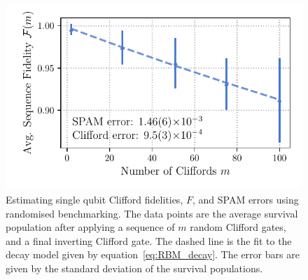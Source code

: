     \begin{figure}
        \begin{center}
        \noindent\includegraphics[width=0.75\linewidth]{
            figures/pdf_figure/rbm_fit.pdf
            }
        \end{center}
        \caption{
            Estimating single qubit Clifford fidelities, $F$, and SPAM errors using randomised benchmarking. 
            The data points are the average survival population after applying a sequence of $m$ random Clifford gates, and a final inverting Clifford gate. The dashed line is the fit to the decay model given by equation~\ref{eq:RBM_decay}. The error bars are given by the standard deviation of the survival populations.
            }
        \label{fig:rbm}
    \end{figure}

